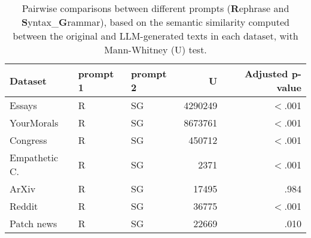 \begin{table*}[ht]
\caption{Pairwise comparisons between different prompts (\textbf{R}ephrase and \textbf{S}yntax\_\textbf{G}rammar), based on the semantic similarity computed between the original and LLM-generated texts in each dataset, with Mann-Whitney (U) test.}
\centering
\begin{tabular}{lllrr}
\toprule
Dataset & prompt 1 & prompt 2 & U & Adjusted p-value \\\hline
Essays & R & SG & 4290249 & $<$.001\\
\hline
YourMorals & R & SG & 8673761 & $<$.001\\
\hline
Congress & R & SG & 450712 & $<$.001\\
\hline
Empathetic C. & R & SG & 2371 & $<$.001\\
\hline
ArXiv & R & SG & 17495 & .984 \\
\hline
Reddit & R & SG & 36775 & $<$.001 \\
\hline
Patch news & R & SG & 22669 & .010\\
\bottomrule
\end{tabular}
\label{tab:pairwise_sim_prompt}
\end{table*}
